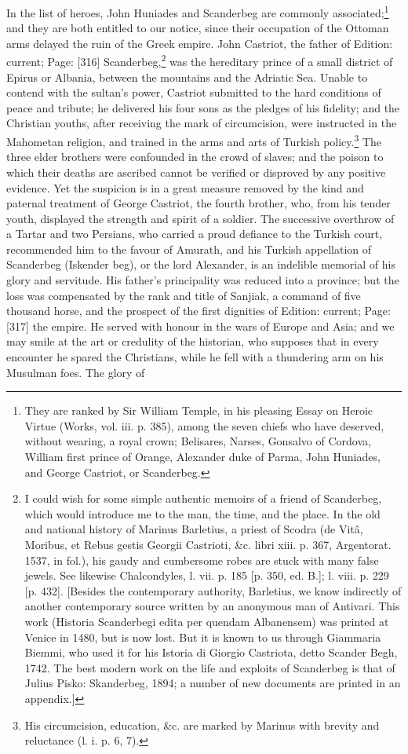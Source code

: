 In the list of heroes, John Huniades and Scanderbeg are commonly associated;\footnote{They are ranked by Sir William Temple, in his pleasing Essay on Heroic Virtue (Works, vol. iii. p. 385), among the seven chiefs who have deserved, without wearing, a royal crown; Belisares, Narses, Gonsalvo of Cordova, William first prince of Orange, Alexander duke of Parma, John Huniades, and George Castriot, or Scanderbeg.} and they are both entitled to our notice, since their occupation of the Ottoman arms delayed the ruin of the Greek empire. John Castriot, the father of Edition: current; Page: [316] Scanderbeg,\footnote{I could wish for some simple authentic memoirs of a friend of Scanderbeg, which would introduce me to the man, the time, and the place. In the old and national history of Marinus Barletius, a priest of Scodra (de Vitâ, Moribus, et Rebus gestis Georgii Castrioti, \&c. libri xiii. p. 367, Argentorat. 1537, in fol.), his gaudy and cumbersome robes are stuck with many false jewels. See likewise Chalcondyles, l. vii. p. 185 [p. 350, ed. B.]; l. viii. p. 229 [p. 432]. [Besides the contemporary authority, Barletius, we know indirectly of another contemporary source written by an anonymous man of Antivari. This work (Historia Scanderbegi edita per quendam Albanensem) was printed at Venice in 1480, but is now lost. But it is known to us through Giammaria Biemmi, who used it for his Istoria di Giorgio Castriota, detto Scander Begh, 1742. The best modern work on the life and exploits of Scanderbeg is that of Julius Pisko: Skanderbeg, 1894; a number of new documents are printed in an appendix.]} was the hereditary prince of a small district of Epirus or Albania, between the mountains and the Adriatic Sea. Unable to contend with the sultan\texthebrew{}’s power, Castriot submitted to the hard conditions of peace and tribute; he delivered his four sons as the pledges of his fidelity; and the Christian youths, after receiving the mark of circumcision, were instructed in the Mahometan religion, and trained in the arms and arts of Turkish policy.\footnote{His circumcision, education, \&c. are marked by Marinus with brevity and reluctance (l. i. p. 6, 7).} The three elder brothers were confounded in the crowd of slaves; and the poison to which their deaths are ascribed cannot be verified or disproved by any positive evidence. Yet the suspicion is in a great measure removed by the kind and paternal treatment of George Castriot, the fourth brother, who, from his tender youth, displayed the strength and spirit of a soldier. The successive overthrow of a Tartar and two Persians, who carried a proud defiance to the Turkish court, recommended him to the favour of Amurath, and his Turkish appellation of Scanderbeg (Iskender beg), or the lord Alexander, is an indelible memorial of his glory and servitude. His father\texthebrew{}’s principality was reduced into a province; but the loss was compensated by the rank and title of Sanjiak, a command of five thousand horse, and the prospect of the first dignities of Edition: current; Page: [317] the empire. He served with honour in the wars of Europe and Asia; and we may smile at the art or credulity of the historian, who supposes that in every encounter he spared the Christians, while he fell with a thundering arm on his Musulman foes. The glory of 